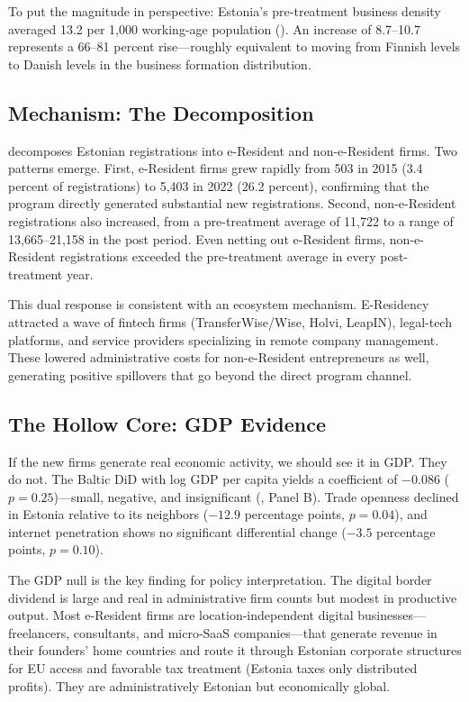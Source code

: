 \documentclass[12pt]{article}
\begin{document}
To put the magnitude in perspective: Estonia's pre-treatment business density averaged 13.2 per 1,000 working-age population (). An increase of 8.7--10.7 represents a 66--81 percent rise---roughly equivalent to moving from Finnish levels to Danish levels in the business formation distribution.

\subsection{Mechanism: The Decomposition}



 decomposes Estonian registrations into e-Resident and non-e-Resident firms. Two patterns emerge. First, e-Resident firms grew rapidly from 503 in 2015 (3.4 percent of registrations) to 5,403 in 2022 (26.2 percent), confirming that the program directly generated substantial new registrations. Second, non-e-Resident registrations also increased, from a pre-treatment average of 11,722 to a range of 13,665--21,158 in the post period. Even netting out e-Resident firms, non-e-Resident registrations exceeded the pre-treatment average in every post-treatment year.

This dual response is consistent with an ecosystem mechanism. E-Residency attracted a wave of fintech firms (TransferWise/Wise, Holvi, LeapIN), legal-tech platforms, and service providers specializing in remote company management. These lowered administrative costs for non-e-Resident entrepreneurs as well, generating positive spillovers that go beyond the direct program channel.

\subsection{The Hollow Core: GDP Evidence}

If the new firms generate real economic activity, we should see it in GDP. They do not. The Baltic DiD with log GDP per capita yields a coefficient of $-0.086$ ($p = 0.25$)---small, negative, and insignificant (, Panel B). Trade openness declined in Estonia relative to its neighbors ($-12.9$ percentage points, $p = 0.04$), and internet penetration shows no significant differential change ($-3.5$ percentage points, $p = 0.10$).

The GDP null is the key finding for policy interpretation. The digital border dividend is large and real in administrative firm counts but modest in productive output. Most e-Resident firms are location-independent digital businesses---freelancers, consultants, and micro-SaaS companies---that generate revenue in their founders' home countries and route it through Estonian corporate structures for EU access and favorable tax treatment (Estonia taxes only distributed profits). They are administratively Estonian but economically global.
\end{document}
